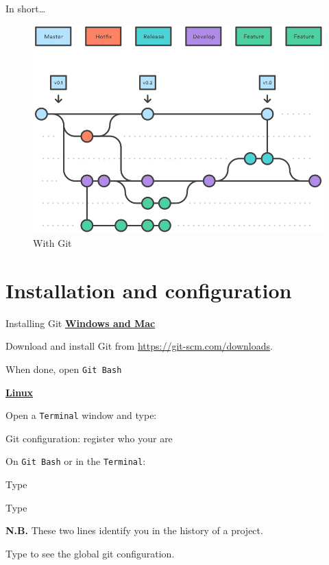 \documentclass[10pt]{beamer}
\begin{document}
\begin{frame}{In short\ldots{}}
\begin{figure}
\begin{minipage}[b]{0.5\linewidth}
{{\includegraphics[width=\textwidth]{img/git-flow.jpg}

}

\caption{\label{fig-version-2}With Git}

}

\end{minipage}%

\end{figure}
\end{frame}

\section{Installation and configuration}




\begin{frame}[fragile]{Installing Git}
\protect\hypertarget{installing-git}{}
\underline{\textbf{Windows and Mac}}

Download and install Git from \url{https://git-scm.com/downloads}.

When done, open \texttt{Git\ Bash}

\underline{\textbf{Linux}}

Open a \texttt{Terminal} window and type:

\end{frame}



\begin{frame}[fragile]{Git configuration: register who your are}

On \texttt{Git\ Bash} or in the \texttt{Terminal}:

Type

Type 

\textbf{N.B.} These two lines identify you in the history of a project.

Type  to see the global git
configuration.
\end{frame}
\end{document}
